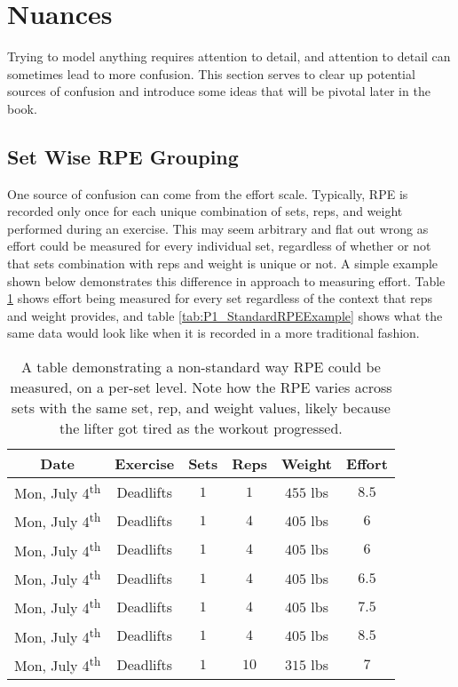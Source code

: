 \section{Nuances}
\label{sec:P1_Nuances}

Trying to model anything requires attention to detail, and attention to detail can sometimes lead to more confusion. This section serves to clear up potential sources of confusion and introduce some ideas that will be pivotal later in the book.

\subsection{Set Wise RPE Grouping}
\label{sec:P1_SetWiseRPEGrouping}

One source of confusion can come from the effort scale. Typically, RPE is recorded only once for each unique combination of sets, reps, and weight performed during an exercise. This may seem arbitrary and flat out wrong as effort could be measured for every individual set, regardless of whether or not that sets combination with reps and weight is unique or not. A simple example shown below demonstrates this difference in approach to measuring effort. Table \ref{tab:P1_NonStandardRPEExample} shows effort being measured for every set regardless of the context that reps and weight provides, and table \ref{tab:P1_StandardRPEExample} shows what the same data would look like when it is recorded in a more traditional fashion.

\begin{table}[h]
	\centering
	\begin{tabular}{c|c|c|c|c|c}
		Date & Exercise & Sets & Reps & Weight & Effort \\
        \hline
        Mon, July 4\textsuperscript{th} & Deadlifts & $1$ & $1$ & $455$ lbs & $8.5$ \\
        Mon, July 4\textsuperscript{th} & Deadlifts & $1$ & $4$ & $405$ lbs & $6$ \\
        Mon, July 4\textsuperscript{th} & Deadlifts & $1$ & $4$ & $405$ lbs & $6$ \\
        Mon, July 4\textsuperscript{th} & Deadlifts & $1$ & $4$ & $405$ lbs & $6.5$ \\
        Mon, July 4\textsuperscript{th} & Deadlifts & $1$ & $4$ & $405$ lbs & $7.5$ \\
        Mon, July 4\textsuperscript{th} & Deadlifts & $1$ & $4$ & $405$ lbs & $8.5$ \\
        Mon, July 4\textsuperscript{th} & Deadlifts & $1$ & $10$ & $315$ lbs & $7$ \\
	\end{tabular}
	\caption{A table demonstrating a non-standard way RPE could be measured, on a per-set level. Note how the RPE varies across sets with the same set, rep, and weight values, likely because the lifter got tired as the workout progressed.}
	\label{tab:P1_NonStandardRPEExample}
\end{table}

